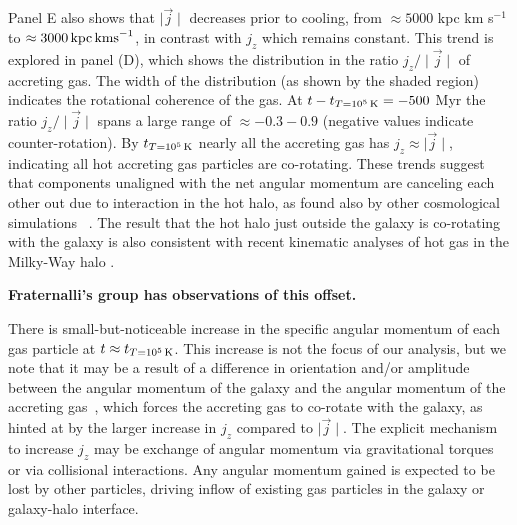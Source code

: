 \documentclass[fleqn,usenatbib]{mnras}
\newcommand{\tcon}{t_{T=10^5\,{\rm K}}}
\begin{document}
Panel E also shows that $\mid \vec j \mid$ decreases prior to cooling, from $\approx 5000$ kpc km s$^{-1}$ to $\approx 3000\,{\rm kpc\,km s}^{-1}$, in contrast with  $j_z$ which remains constant.
This trend is explored in  panel (D), which shows the distribution in the ratio $j_z/\mid\vec j\mid$ of accreting gas.
The width of the distribution (as shown by the shaded region) indicates the rotational coherence of the gas. 
At $t-\tcon=-500$ Myr the ratio $j_z/\mid\vec j\mid$ spans a large range of $\approx -0.3 - 0.9$ (negative values indicate counter-rotation).
By $\tcon$ nearly all the accreting gas has $j_z\approx\mid\vec j\mid$, indicating all hot accreting gas particles are co-rotating. 
These trends suggest that components unaligned with the net angular momentum are canceling each other out due to interaction in the hot halo, as found also by other cosmological simulations ~\citep[e.g.][]{DeFelippis2017}.
The result that the hot halo just outside the galaxy is co-rotating with the galaxy is also consistent with recent kinematic analyses of hot gas in the Milky-Way halo \citep{Miller2016}.

\textbf{Fraternalli's group has observations of this offset.}

There is small-but-noticeable increase in the specific angular momentum of each gas particle at $t \approx \tcon$.
This increase is not the focus of our analysis, but we note that it may be a result of a difference in orientation and/or amplitude between the angular momentum of the galaxy and the angular momentum of the accreting gas~\citep[e.g.][]{Danovich2012, DeFelippis2017, DeFelippis2020}, which forces the accreting gas to co-rotate with the galaxy, as hinted at by the larger increase in $j_z$ compared to $\mid \vec j \mid$.
The explicit mechanism to increase $j_z$ may be exchange of angular momentum via gravitational torques~\citep[e.g.][]{Danovich2015} or via collisional interactions.
Any angular momentum gained is expected to be lost by other particles, driving inflow of existing gas particles in the galaxy or galaxy-halo interface.
\end{document}
